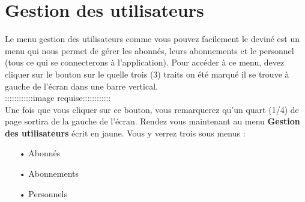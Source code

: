\documentclass[12pt,a4paper]{article}
\begin{document}
\newpage
\section{Gestion des utilisateurs}
Le menu gestion des utilisateurs comme vous pouvez facilement le deviné est un menu qui
nous permet de gérer les abonnés, leurs abonnements et le personnel (tous ce qui se
connecterons à l'application). Pour accéder à ce menu, devez cliquer sur le bouton sur le
quelle trois (3) traits on été marqué il se trouve à gauche de l'écran dans une barre
vertical. \\

::::::::::::image requise::::::::::::\\

Une fois que vous cliquer sur ce bouton, vous remarquerez qu'un quart (1/4) de page 
sortira de la gauche de l'écran. Rendez vous maintenant au menu \textbf{Gestion des
utilisateurs} écrit en jaune. Vous y verrez trois sous menus :
\begin{itemize}
\item[•] Abonnés
\item[•] Abonnements
\item[•] Personnels
\end{itemize}
\end{document}
